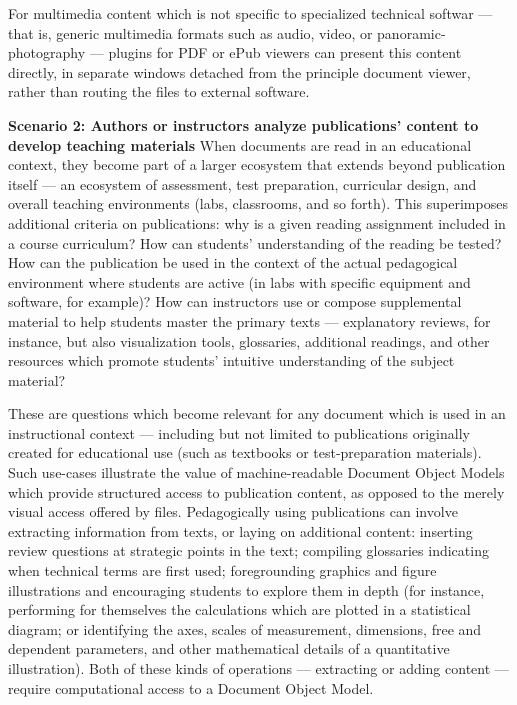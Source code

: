 \documentclass[10pt,letterpaper]{article}
\newcommand{\pseudoIndent}{

\vspace{10pt}\hspace*{38pt}}
\newcommand{\LPF}{\resizebox{!}{8pt}{\AcronymText{LPF}}}
\newcommand{\textscc}[1]{{\color{orr!35!black}{{%
						\fontfamily{Cabin-TLF}\fontseries{b}\selectfont{\textsc{\scriptsize{#1}}}}}}}
\newcommand{\AcronymText}[1]{{\textscc{#1}}}
\newcommand{\PDF}{\resizebox{!}{8pt}{\AcronymText{PDF}}}
\newenvironment{mldescription}{%
  \begin{addmargin}[4pt]{1em}
    \setlength{\parindent}{-1em}%
    \newcommand*{\mlitem}[1][]{\vspace{20pt}\par\medskip\textbf{##1}\quad}\indent
}{%
  \end{addmargin}
  \medskip
}
\begin{document}
{{\begin{mldescription}
\pseudoIndent{} For multimedia content which is 
not specific to specialized technical softwar 
--- that is, generic multimedia formats such as 
audio, video, or panoramic-photography --- 
\LPF{} plugins for PDF or ePub viewers can present 
this content directly, in separate windows detached 
from the principle document viewer, rather than 
routing the files to external software.   

\mlitem[Scenario 2: Authors or instructors 
analyze publications' content to develop teaching 
materials]  When documents are read in an 
educational context, they become part of a 
larger ecosystem that extends beyond publication 
itself --- an ecosystem of assessment, test preparation, 
curricular design, and overall teaching environments 
(labs, classrooms, and so forth).  This superimposes 
additional criteria on publications: why is a given 
reading assignment included in a course curriculum?  
How can students' understanding of the reading be 
tested?  How can the publication be used in the 
context of the actual pedagogical environment where 
students are active (in labs with specific 
equipment and software, for example)?  How can 
instructors use or compose supplemental material to 
help students master the primary texts 
--- explanatory reviews, for instance, but also 
visualization tools, glossaries, additional readings, 
and other resources which promote students' intuitive 
understanding of the subject material?    

\pseudoIndent{} These are questions which become 
relevant for any document which is used in an 
instructional context --- including but not limited 
to publications originally created for 
educational use (such as textbooks or test-preparation 
materials).  Such use-cases illustrate the value of 
machine-readable Document Object Models which provide 
structured access to publication content, as opposed 
to the merely visual access offered by \PDF{} files.  
Pedagogically using publications can involve extracting 
information from texts, or laying on additional 
content: inserting review questions at strategic 
points in the text; compiling glossaries indicating 
when technical terms are first used; foregrounding 
graphics and figure illustrations and encouraging 
students to explore them in depth 
(for instance, performing for themselves the calculations 
which are plotted in a statistical diagram; or 
identifying the axes, scales of measurement, dimensions, 
free and dependent parameters, and other mathematical 
details of a quantitative illustration).  Both of 
these kinds of operations --- extracting or adding 
content --- require computational access to a 
Document Object Model.    
 

\end{mldescription}}}
\end{document}
